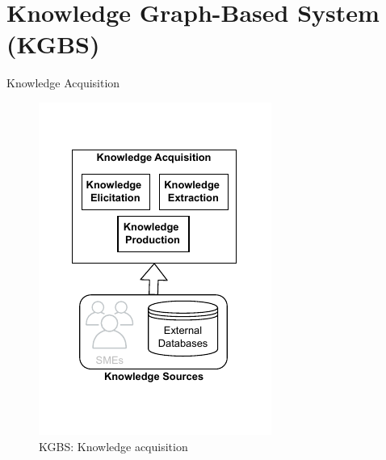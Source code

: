 \section[KG-based system]{Knowledge Graph-Based System (KGBS)}

\begin{frame}{Knowledge Acquisition}

    \begin{figure} [H]
        \begin{center}
            \includegraphics[scale=0.8]{images/KGBS-knowledge-acquisition.pdf} 
            \caption{KGBS: Knowledge acquisition} 
        \end{center}
    \end{figure}

\end{frame}

